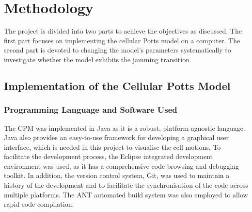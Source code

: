 \documentclass[a4paper,12pt]{article}
\begin{document}
\newpage
\section{Methodology}
The project is divided into two parts to achieve the objectives as discussed. The first part focuses on implementing the cellular Potts model on a computer. The second part is devoted to changing the model's parameters systematically to investigate whether the model exhibits the jamming transition.

\subsection{Implementation of the Cellular Potts Model}
\subsubsection{Programming Language and Software Used}
The CPM was implemented in Java as it is a robust, platform-agnostic language. Java also provides an easy-to-use framework for developing a graphical user interface, which is needed in this project to visualise the cell motions. To facilitate the development process, the Eclipse integrated development environment was used, as it has a comprehensive code browsing and debugging toolkit. In addition, the version control system, Git, was used to maintain a history of the development and to facilitate the synchronisation of the code across multiple platforms. The ANT automated build system was also employed to allow rapid code compilation.
\end{document}
